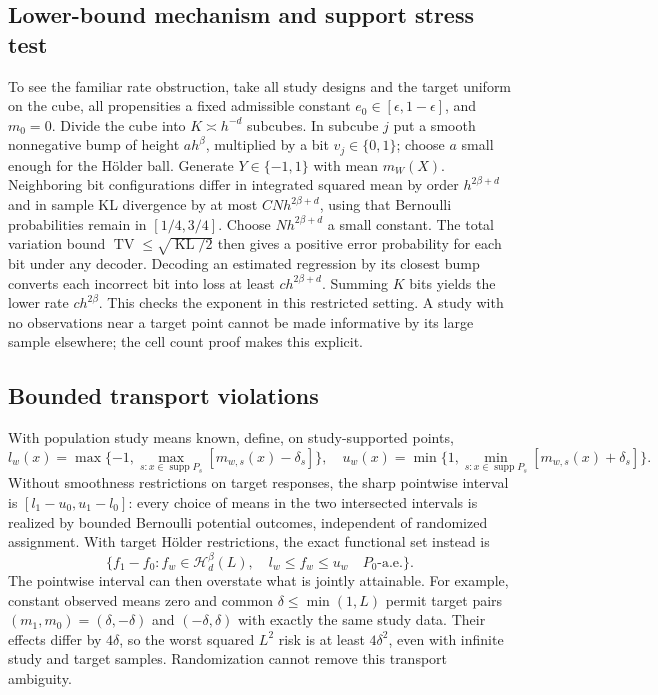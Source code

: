 \documentclass[11pt]{article}
\begin{document}
\subsection*{Lower-bound mechanism and support stress test}
To see the familiar rate obstruction, take all study designs and the target
uniform on the cube, all propensities a fixed admissible constant
$e_0\in[\epsilon,1-\epsilon]$, and $m_0=0$. Divide the cube
into $K\asymp h^{-d}$ subcubes. In subcube $j$ put a smooth nonnegative
bump of height $a h^\beta$, multiplied by a bit $v_j\in\{0,1\}$;
choose $a$ small enough for the H\"older ball. Generate $Y\in\{-1,1\}$
with mean $m_W(X)$. Neighboring bit configurations differ in integrated
squared mean by order $h^{2\beta+d}$ and in sample KL divergence by at
most $CNh^{2\beta+d}$, using that Bernoulli probabilities remain in
$[1/4,3/4]$. Choose $Nh^{2\beta+d}$ a small constant. The total variation
bound $\operatorname{TV}\leq\sqrt{\operatorname{KL}/2}$ then gives a
positive error probability for each bit under any decoder. Decoding an
estimated regression by its closest bump converts each incorrect bit into
loss at least $ch^{2\beta+d}$. Summing $K$ bits yields the lower rate
$ch^{2\beta}$. This checks the exponent in this restricted setting.
A study with no observations near a target point cannot be made informative
by its large sample elsewhere; the cell count proof makes this explicit.

\subsection*{Bounded transport violations}
With population study means known, define, on study-supported points,
\[
 l_w(x)=\max\{-1,\max_{s:x\in\operatorname{supp}P_s}
 [m_{w,s}(x)-\delta_s]\},\quad
 u_w(x)=\min\{1,\min_{s:x\in\operatorname{supp}P_s}
 [m_{w,s}(x)+\delta_s]\}.
\]
Without smoothness restrictions on target responses, the sharp pointwise
interval is $[l_1-u_0,u_1-l_0]$: every choice of means in the two
intersected intervals is realized by bounded Bernoulli potential outcomes,
independent of randomized assignment. With target H\"older restrictions,
the exact functional set instead is
\[
 \{f_1-f_0:f_w\in\mathcal H_d^\beta(L),\quad
 l_w\leq f_w\leq u_w\quad P_0\text{-a.e.}\}.
\]
The pointwise interval can then overstate what is jointly attainable.
For example, constant observed means zero and common $\delta\leq\min(1,L)$
permit target pairs $(m_1,m_0)=(\delta,-\delta)$ and
$(-\delta,\delta)$ with exactly the same study data. Their effects differ
by $4\delta$, so the worst squared $L^2$ risk is at least $4\delta^2$,
even with infinite study and target samples. Randomization cannot remove
this transport ambiguity.
\end{document}
